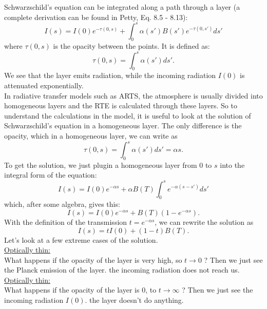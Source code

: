 \documentclass[a4paper,fleqn]{article}
\begin{document}
Schwarzschild's equation can be integrated along a path through a layer
(a complete derivation can be found in Petty, Eq. 8.5 - 8.13):
\begin{equation}
	I(s) = I(0) e^{-\tau (0,s)} + \int_{0}^{s} \alpha (s') B(s') 
	e^{-\tau (0,s')} ds' 
\end{equation}
where $\tau(0,s)$ is the opacity between the points. It is defined as:
\begin{equation}
	\tau (0,s) = \int_{0}^{s} \alpha(s') ds'.
\end{equation}
We see that the layer emits radiation, while the incoming radiation $I(0)$ is 
attenuated exponentially. \\
In radiative transfer models such as ARTS, the atmosphere is usually divided 
into homogeneous layers and the RTE is calculated through these layers. So to understand
the calculations in the model, it is useful to look at the solution of Schwarzschild's
equation in a homogeneous layer. The only difference is the opacity, which in a homogeneous
layer, we can write as
\begin{equation}
	\tau(0,s) = \int_{0}^{s} \alpha(s') ds' = \alpha s.
\end{equation}
To get the solution, we just plugin a homogeneous layer from 0 to $s$ into the integral 
form of the equation:
\begin{equation}
	I(s) = I(0) e^{-\alpha s} + \alpha B(T)\int_{0}^{s} e^{-\alpha (s-s')} ds' 
\end{equation}
which, after some algebra, gives this:
\begin{equation}
	I(s) = I(0) e^{-\alpha s} + B(T) \left( 1-e^{-\alpha s} \right).
\end{equation}
With the definition of the transmission $t = e^{-\alpha s}$, we can rewrite the solution as
\begin{equation}
	I(s) = t I(0)  + \left( 1-t \right) B(T).
\end{equation}
Let's look at a few extreme cases of the solution.\\
\underline{Optically thin:}\\
What happens if the opacity of the layer is very high, so $ t\rightarrow0$ ? 
Then we just see the Planck emission of the layer. the incoming radiation does not reach us.\\
\underline{Optically thin:}\\
What happens if the opacity of the layer is 0, to $ t \rightarrow \infty$ ? Then we just see
the incoming radiation $I(0)$. the layer doesn't do anything.\\
\end{document}
